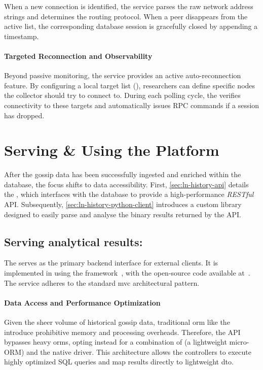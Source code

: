 When a new connection is identified, the service parses the raw network address strings and determines the routing protocol. 
When a peer disappears from the active list, the corresponding database session is gracefully closed by appending a  timestamp.

\paragraph{Targeted Reconnection and Observability}
Beyond passive monitoring, the service provides an active auto-reconnection feature. 
By configuring a local target list (), 
researchers can define specific nodes the collector should try to connect to. 
During each polling cycle, the  verifies connectivity to these targets 
and automatically issues  RPC commands if a session has dropped. 

 

\section{Serving \& Using the Platform}

After the gossip data has been successfully ingested and enriched within the database, the focus shifts to data accessibility. 
First, \autoref{sec:ln-history-api} details the , which interfaces with the database to provide a high-performance \textit{RESTful} API. 
Subsequently, \autoref{sec:ln-history-python-client} introduces a custom  library designed to easily parse and analyse the binary results returned by the API.

\subsection{Serving analytical results: }
\label{sec:ln-history-api}

The  serves as the primary backend interface for external clients. 
It is implemented in  using the  framework~\cite{microsoftcorporation_net_2026}, 
with the open-source code available at~\cite{kraus_lnhistoryapi_2026}. 
The service adheres to the standard \gls{mvc} architectural pattern.

\paragraph{Data Access and Performance Optimization}
Given the sheer volume of historical gossip data, traditional \gls{orm} 
like the  introduce prohibitive memory and processing overheads. 
Therefore, the API bypasses heavy \glspl{orm}, opting instead for a combination of 
 (a lightweight micro-ORM) and the native  driver. 
This architecture allows the controllers to execute highly optimized SQL queries and 
map results directly to lightweight \gls{dto}. 

